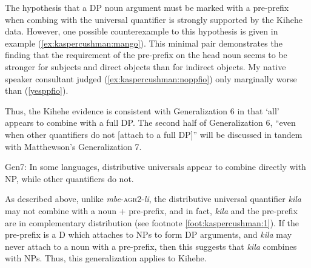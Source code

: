 \documentclass[output=paper,modfonts,nonflat]{langsci/langscibook}
\begin{document}
The hypothesis that a DP noun argument must be marked with a pre-prefix when combing with the universal quantifier is strongly supported by the Kihehe data.  However, one possible counterexample to this hypothesis is given in example (\ref{ex:kaspercushman:mango}). This minimal pair demonstrates the finding that the requirement of the pre-prefix on the head noun seems to be stronger for subjects and direct objects than for indirect objects.  My native speaker consultant judged (\ref{ex:kaspercushman:noppfio}) only marginally worse than (\ref{yesppfio}). 

\begin{exe} 
\ex  \label{ex:kaspercushman:mango} \begin{xlist}

\end{xlist}
\end{exe}

Thus, the Kihehe evidence is consistent with Generalization 6 in that `all' appears to combine with a full DP.  The second half of Generalization 6, ``even when other quantifiers do not [attach to a full DP]'' will be discussed in tandem with Matthewson's Generalization 7. 


\begin{exe}
\ex Gen7: In some languages, distributive universals appear to combine directly with NP, while other quantifiers do not. \citep[36]{Matthewson2013} 
\end{exe}

As described above, unlike \textit{mbe}-\textsc{agr2}-\textit{li}, the distributive universal quantifier \textit{kila} may not combine with a noun + pre-prefix, and in fact, \textit{kila} and the pre-prefix are in complementary distribution (see footnote \ref{foot:kaspercushman:1}). If the pre-prefix is a D which attaches to NPs to form DP arguments, and \textit{kila} may never attach to a noun with a pre-prefix, then this suggests that \textit{kila} combines with NPs. Thus, this generalization applies to Kihehe. 
\end{document}
